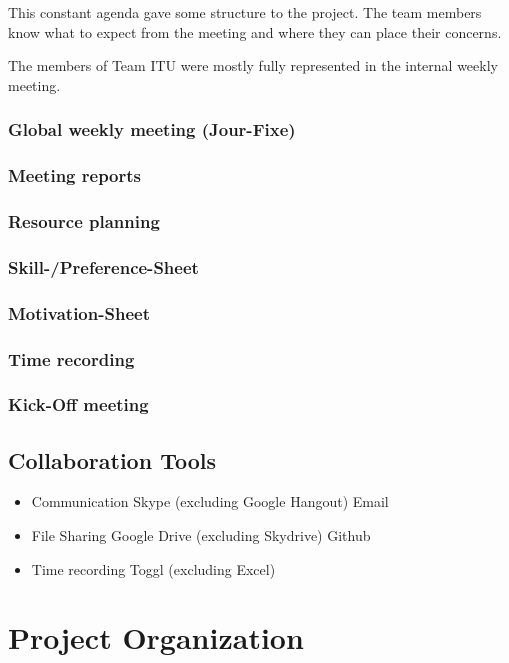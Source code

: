 This constant agenda gave some structure to the project. The team members know what to expect from the meeting and where they can place their concerns.

The members of Team ITU were mostly fully represented in the internal weekly meeting. 

\subsubsection {Global weekly meeting (Jour-Fixe)}
\subsubsection {Meeting reports}
\subsubsection {Resource planning}
\subsubsection {Skill-/Preference-Sheet}
\subsubsection {Motivation-Sheet}
\subsubsection {Time recording}
\subsubsection {Kick-Off meeting}


\subsection{Collaboration Tools}

	\begin{itemize}
		\item Communication
			\subitem Skype (excluding Google Hangout)
			\subitem Email
		\item File Sharing
			\subitem Google Drive (excluding Skydrive)
			\subitem Github
		\item Time recording
			\subitem Toggl (excluding Excel)
	\end{itemize}


\section{Project Organization}

